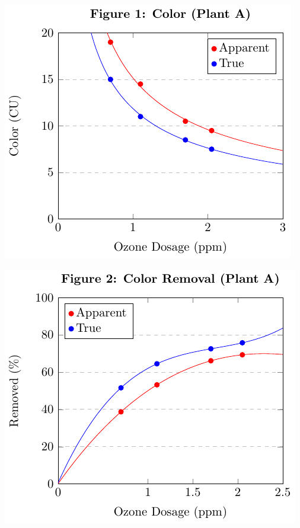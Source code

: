\begin{center}

\pgfplotsset{width=8cm}

\begin{minipage}{.5\textwidth}
    \centering
    \includegraphics*[page=1]{figs/fig1.pdf}
    \end{minipage}%
    \begin{minipage}{.5\textwidth}
    \centering
    \includegraphics*[page=1]{figs/fig2.pdf}
    \end{minipage}
    \vspace{6mm}
    \newpage


\end{center}
